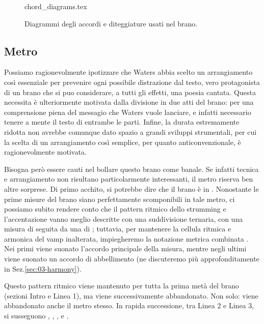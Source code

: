 \documentclass[class=book, crop=false, oneside, 12pt]{standalone}
\begin{document}
    \begin{figure}
        {chord_diagrams.tex}
        \caption{Diagrammi degli accordi e diteggiature usati nel brano.}
        \label{fig:03-chords}
    \end{figure}

    \subsection{Metro}
    Possiamo ragionevolmente ipotizzare che Waters abbia scelto un arrangiamento così essenziale per prevenire ogni possibile distrazione dal testo, vero protagonista di un brano che si puo considerare, a tutti gli effetti, una poesia cantata. Questa necessita è ulteriormente motivata dalla divisione in due atti del brano: per una comprensione piena del messagio che Waters vuole lanciare, e infatti necessario tenere a mente il testo di entrambe le parti. Infine, la durata estremamente ridotta non avrebbe comunque dato spazio a grandi sviluppi strumentali, per cui la scelta di un arrangiamento così semplice, per quanto anticonvenzionale, è ragionevolmente motivata. 

    Bisogna però essere cauti nel bollare questo brano come banale. Se infatti  tecnica e arrangiamento  non risultano particolarmente interessanti, il metro riserva ben altre sorprese. Di primo acchito, si potrebbe dire che il brano è in . Nonostante le prime misure del brano siano perfettamente scomponibili in tale metro, ci possiamo subito rendere conto che il pattern ritmico dello strumming e l'accentazione vanno meglio descritte con una suddivisione ternaria, con una misura di  seguita da una di ; tuttavia, per mantenere la cellula ritmica e armonica del vamp inalterata, impiegheremo la notazione metrica combinata   . Nei primi  viene suonato l'accordo principale della misura, mentre negli ultimi  viene suonato un accordo di abbellimento (ne discuteremo più approfonditamente in Sez.\ref{sec:03-harmony}). 
    
    \begin{sheet}[htbp]
        \centering
        \caption{Pattern ritmico dell'introduzione.}
        \label{sheet:potw-rhythm_intro}
    \end{sheet}

    Questo pattern ritmico viene mantenuto per tutta la prima metà del brano (sezioni Intro e Linea 1), ma viene successivamente abbandonato. Non solo: viene abbandonato anche il metro stesso. In rapida successione, tra Linea 2 e Linea 3, si susseguono , , ,  e .
\end{document}
